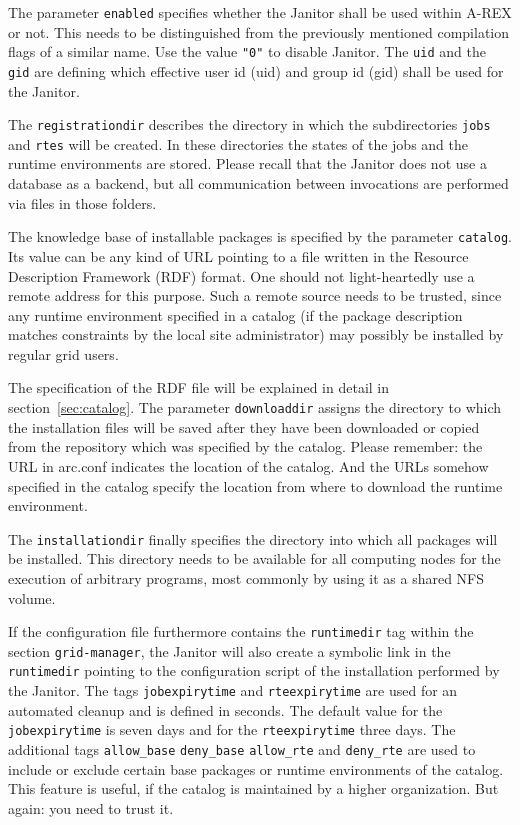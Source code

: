 The parameter \texttt{enabled} specifies whether the Janitor shall be used
within A-REX or not. This needs to be distinguished from the previously mentioned
compilation flags of a similar name. Use the value \texttt{"0"} to disable Janitor. The
\texttt{uid} and the \texttt{gid} are defining which effective user id
(uid) and group id (gid) shall be used for the Janitor.

The \texttt{registrationdir} describes the directory in which the
subdirectories \texttt{jobs} and \texttt{rtes} will be created.
In these directories the states of the jobs and the runtime environments
are stored. Please recall that the Janitor does not use a database as
a backend, but all communication between invocations are performed via
files in those folders.

The knowledge base of installable packages is specified by the parameter
\texttt{catalog}.  Its value can be any kind of URL pointing to a file
written in the Resource Description Framework (RDF) format.  One should
not light-heartedly use a remote address for this purpose. Such a remote
source needs to be trusted, since any runtime environment specified in
a catalog (if the package description matches constraints by the local
site administrator) may possibly be installed by regular grid users.

The specification of the RDF file will be explained in detail in
section~\ref{sec:catalog}.  The parameter \texttt{downloaddir} assigns
the directory to which the installation files will be saved after they
have been downloaded or copied from the repository which was specified by
the catalog. Please remember: the URL in arc.conf indicates the location
of the catalog. And the URLs somehow specified in the catalog specify
the location from where to download the runtime environment.

The \texttt{installationdir} finally specifies the directory into which
all packages will be installed. This directory needs to be available
for all computing nodes for the execution of arbitrary programs, most
commonly by using it as a shared NFS volume.

If the configuration file furthermore contains the \texttt{runtimedir}
tag within the section \texttt{grid-manager}, the Janitor will also
create a symbolic link in the \texttt{runtimedir} pointing to the
configuration script of the installation performed by the Janitor.
The tags \texttt{jobexpirytime} and \texttt{rteexpirytime} are used
for an automated cleanup and is defined in seconds.  The default
value for the \texttt{jobexpirytime} is seven days and for
the \texttt{rteexpirytime} three days.  The additional tags
\texttt{allow\_base} \texttt{deny\_base} \texttt{allow\_rte} and
\texttt{deny\_rte} are used to include or exclude certain base packages
or runtime environments of the catalog. This feature is useful, if the
catalog is maintained by a higher organization. But again: you need to
trust it.

